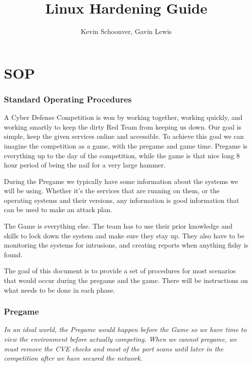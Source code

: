 \documentclass{article}
\title{\textbf{Linux Hardening Guide}}
\author{Kevin Schoonver, Gavin Lewis}
\begin{document}
\maketitle

\tableofcontents 

\pagebreak 

\part{SOP}

\section{Standard Operating Procedures}
A Cyber Defense Competition is won by working together, working quickly, and working
smartly to keep the dirty Red Team from keeping us down. Our goal is simple, keep the
given services online and accessible. To achieve this goal we can imagine the competition as
a game, with the pregame and game time. Pregame is everything up to the day of the competition,
while the game is that nice long 8 hour period of being the nail for a very large hammer.

During the Pregame we typically have some information about the systems we will be using. Whether
it's the services that are running on them, or the operating systems and their versions, any information
is good information that can be used to make an attack plan. 

The Game is everything else. The team has to use their prior knowledge and skills to lock down
the system and make sure they stay up. They also have to be monitoring the systems for intrusions, and creating reports when anything fishy is found.

The goal of this document is to provide a set of procedures for most scenarios that would
occur during the pregame and the game. There will be instructions on what needs to be done
in each phase.

\section{Pregame}
\textit{In an ideal world, the Pregame would happen before the Game so we have time to view the environment before actually competing. When we cannot pregame, we must remove the CVE checks and most of the port scans until later in the competition after we have secured the network.}
\end{document}
